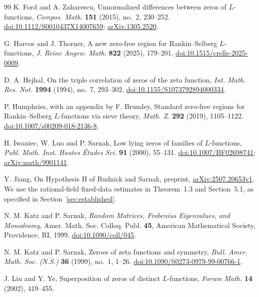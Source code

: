 \documentclass[11pt]{article}
\numberwithin{equation}{section}
\theoremstyle{remark}
\begin{document}
\begin{thebibliography}{99}
K. Ford and A. Zaharescu,
Unnormalized differences between zeros of $L$-functions,
\emph{Compos. Math.} \textbf{151} (2015), no.~2, 230--252.
\href{https://doi.org/10.1112/S0010437X14007659}{doi:10.1112/S0010437X14007659}; \href{https://arxiv.org/abs/1305.2520}{arXiv:1305.2520}.

G. Harcos and J. Thorner,
A new zero-free region for Rankin--Selberg $L$-functions,
\emph{J. Reine Angew. Math.} \textbf{822} (2025), 179--201.
\href{https://doi.org/10.1515/crelle-2025-0009}{doi:10.1515/crelle-2025-0009}.

D. A. Hejhal,
On the triple correlation of zeros of the zeta function,
\emph{Int. Math. Res. Not.} \textbf{1994} (1994), no.~7, 293--302.
\href{https://doi.org/10.1155/S1073792894000334}{doi:10.1155/S1073792894000334}.

P. Humphries, with an appendix by F. Brumley, Standard zero-free regions
for Rankin--Selberg $L$-functions via sieve theory,
\textit{Math. Z.} \textbf{292} (2019), 1105--1122.
\href{https://doi.org/10.1007/s00209-018-2136-8}{doi:10.1007/s00209-018-2136-8}.

H. Iwaniec, W. Luo and P. Sarnak,
Low lying zeros of families of $L$-functions,
\emph{Publ. Math. Inst. Hautes \'Etudes Sci.} \textbf{91} (2000), 55--131.
\href{https://doi.org/10.1007/BF02698741}{doi:10.1007/BF02698741}; \href{https://arxiv.org/abs/math/9901141}{arXiv:math/9901141}.

Y. Jiang, On Hypothesis H of Rudnick and Sarnak, preprint,
\href{https://arxiv.org/abs/2507.20653v1}{arXiv:2507.20653v1}.
We use the rational-field fixed-data estimates in Theorem~1.3 and
Section~5.1, as specified in Section~\ref{sec:established}.

N. M. Katz and P. Sarnak,
\emph{Random Matrices, Frobenius Eigenvalues, and Monodromy},
Amer. Math. Soc. Colloq. Publ. \textbf{45},
American Mathematical Society, Providence, RI, 1999.
\href{https://doi.org/10.1090/coll/045}{doi:10.1090/coll/045}.

N. M. Katz and P. Sarnak,
Zeroes of zeta functions and symmetry,
\emph{Bull. Amer. Math. Soc. (N.S.)} \textbf{36} (1999), no.~1, 1--26.
\href{https://doi.org/10.1090/S0273-0979-99-00766-1}{doi:10.1090/S0273-0979-99-00766-1}.

J. Liu and Y. Ye, Superposition of zeros of distinct $L$-functions,
\textit{Forum Math.} \textbf{14} (2002), 419--455.


\end{thebibliography}
\end{document}
